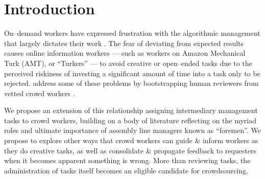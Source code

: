 \documentclass[main]{subfiles}
\begin{document}
\section{Introduction}\label{sec:introduction}



On--demand workers have expressed frustration with the algorithmic management that largely dictates their work
\cite{uberAlgorithm}.
The fear of deviating from expected results causes online information workers 
--- such as workers on Amazon Mechanical Turk (AMT), or ``Turkers'' ---
to avoid creative or open--ended tasks due to the perceived riskiness of
investing a significant amount of time into a task only to be rejected.
\citeauthor{haas2015argonaut} address some of these problems by bootstrapping
human reviewers from vetted crowd workers
\cite{haas2015argonaut}.

We propose an extension of this relationship assigning intermediary management tasks to crowd workers,
building on a body of literature reflecting on the myriad roles and
ultimate importance of assembly line managers known as ``foremen''.
We propose to explore other ways that crowd workers can
guide \& inform workers as they do creative tasks,
as well as consolidate \& propagate feedback to requesters when it becomes apparent something is wrong.
More than reviewing tasks,
the administration of tasks itself becomes an eligible candidate for crowdsourcing.

\onlyinsubfile{
  \printbibliography
}
\end{document}

